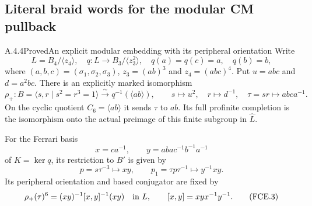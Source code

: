 \subsection{Literal braid words for the modular CM pullback}

\begin{result}{A.4.4}{Proved}{An explicit modular embedding with its peripheral orientation}
Write
\[
 L=B_4/\langle z_4\rangle,\quad
 q:L\longrightarrow B_3/\langle z_3^2\rangle,
 \quad q(a)=q(c)=a,\quad q(b)=b,
\]
where $(a,b,c)=(\sigma _1,\sigma _2,\sigma _3)$,
$z_3=(ab)^3$ and $z_4=(abc)^4$.  Put
$u=abc$ and $d=a^2bc$.  There is an explicitly marked isomorphism
\[
 \rho_+:B=\langle s,r\mid s^2=r^3=1\rangle
       \xrightarrow{\ \sim\ }q^{-1}(\langle ab\rangle),
 \qquad s\longmapsto u^2,
 \quad r\longmapsto d^{-1},
 \quad \tau=sr\longmapsto abc a^{-1}.             \tag{FCE.1}
\]
On the cyclic quotient $C_6=\langle ab\rangle$ it sends $\tau$ to
$ab$.  Its full profinite completion is the isomorphism onto the
actual preimage of this finite subgroup in $\widehat L$.

For the Ferrari basis
\[
 x=ca^{-1},\qquad y=aba c^{-1}b^{-1}a^{-1}
\]
of $K=\ker q$, its restriction to $B'$ is given by
\[
 p=s\tau^{-3}\longmapsto xy,
 \qquad p_1=\tau p\tau^{-1}\longmapsto y^{-1}xy.
                                                               \tag{FCE.2}
\]
Its peripheral orientation and based conjugator are fixed by
\[
 \rho_+(\tau)^6=(xy)^{-1}[x,y]^{-1}(xy)
       \quad\hbox{in }L,\qquad [x,y]=xyx^{-1}y^{-1}.             \tag{FCE.3}
\]
\end{result}

